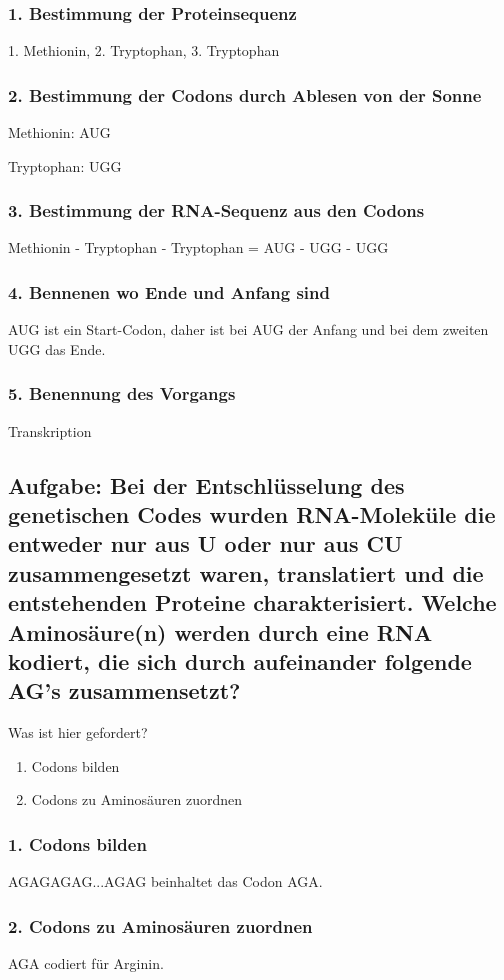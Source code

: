 \documentclass{article}
\begin{document}
\subsubsection*{1. Bestimmung der Proteinsequenz} 
\centerline{1. Methionin, 2. Tryptophan, 3. Tryptophan }
\subsubsection*{2. Bestimmung der Codons durch Ablesen von der Sonne }  
\centerline{Methionin: AUG} 
\centerline{Tryptophan: UGG} 
\subsubsection*{3. Bestimmung der RNA-Sequenz aus den Codons} 
\centerline{Methionin - Tryptophan - Tryptophan  = AUG - UGG - UGG} 
\subsubsection*{4. Bennenen wo Ende und Anfang sind} 
AUG ist ein Start-Codon, daher ist bei AUG der Anfang und bei dem zweiten UGG das Ende.  
\subsubsection*{5. Benennung des Vorgangs} 
\centerline{Transkription} 

\subsection*{Aufgabe: Bei der Entschlüsselung des genetischen Codes wurden RNA-Moleküle  die entweder nur aus U oder nur aus CU zusammengesetzt waren, translatiert und die entstehenden Proteine charakterisiert. Welche Aminosäure(n) werden durch eine RNA kodiert, die sich durch aufeinander folgende AG's zusammensetzt?}
Was ist hier gefordert?
\begin{enumerate}
    \item Codons bilden 
    \item Codons zu Aminosäuren zuordnen
\end{enumerate} 
\subsubsection*{1. Codons bilden} 
AGAGAGAG...AGAG beinhaltet das Codon AGA. \newline
\subsubsection*{2. Codons zu Aminosäuren zuordnen} 
AGA codiert für Arginin.  
\end{document}
